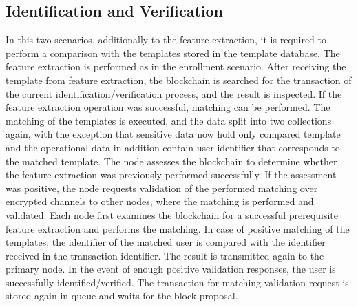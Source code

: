 \subsection{Identification and Verification}
In this two scenarios, additionally to the feature extraction, it is required to perform a comparison with the templates stored in the template database. The feature extraction is performed as in the enrollment scenario. After receiving the template from feature extraction, the blockchain is searched for the transaction of the current identification/verification process, and the result is inspected. If the feature extraction operation was successful, matching can be performed. The matching of the templates is executed, and the data split into two collections again, with the exception that sensitive data now hold only compared template and the operational data in addition contain user identifier that corresponds to the matched template. The node assesses the blockchain to determine whether the feature extraction was previously performed successfully. If the assessment was positive, the node requests validation of the performed matching over encrypted channels to other nodes, where the matching is performed and validated. Each node first examines the blockchain for a successful prerequisite feature extraction and performs the matching. In case of positive matching of the templates, the identifier of the matched user is compared with the identifier received in the transaction identifier. The result is transmitted again to the primary node. In the event of enough positive validation responses, the user is successfully identified/verified. The transaction for matching validation request is stored again in queue and waits for the block proposal.


